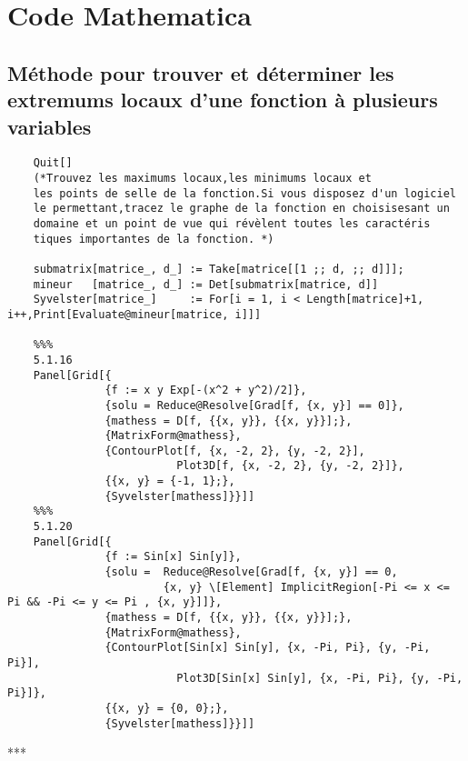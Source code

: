 \section{Code Mathematica}
\subsection{Méthode pour trouver et déterminer les extremums locaux d'une fonction à plusieurs variables}
	\begin{verbatim}
	Quit[]
	(*Trouvez les maximums locaux,les minimums locaux et
	les points de selle de la fonction.Si vous disposez d'un logiciel
	le permettant,tracez le graphe de la fonction en choisisesant un 
	domaine et un point de vue qui révèlent toutes les caractéris­
	tiques importantes de la fonction. *)
	
	submatrix[matrice_, d_] := Take[matrice[[1 ;; d, ;; d]]];
	mineur   [matrice_, d_] := Det[submatrix[matrice, d]]	
	Syvelster[matrice_]     := For[i = 1, i < Length[matrice]+1, i++,Print[Evaluate@mineur[matrice, i]]]
	
	%%%
	5.1.16
	Panel[Grid[{
	           {f := x y Exp[-(x^2 + y^2)/2]},
	           {solu = Reduce@Resolve[Grad[f, {x, y}] == 0]},
	           {mathess = D[f, {{x, y}}, {{x, y}}];},
	           {MatrixForm@mathess},
	           {ContourPlot[f, {x, -2, 2}, {y, -2, 2}], 
	                      Plot3D[f, {x, -2, 2}, {y, -2, 2}]},
	           {{x, y} = {-1, 1};},
	           {Syvelster[mathess]}}]]
	%%%
	5.1.20
	Panel[Grid[{
	           {f := Sin[x] Sin[y]},
	           {solu =	Reduce@Resolve[Grad[f, {x, y}] == 0,
	           			{x, y} \[Element] ImplicitRegion[-Pi <= x <= Pi && -Pi <= y <= Pi , {x, y}]]},
	           {mathess = D[f, {{x, y}}, {{x, y}}];},
	           {MatrixForm@mathess},
	           {ContourPlot[Sin[x] Sin[y], {x, -Pi, Pi}, {y, -Pi, Pi}], 
	                      Plot3D[Sin[x] Sin[y], {x, -Pi, Pi}, {y, -Pi, Pi}]},
	           {{x, y} = {0, 0};},
	           {Syvelster[mathess]}}]]
	\end{verbatim}
	\begin{center}***\end{center}
